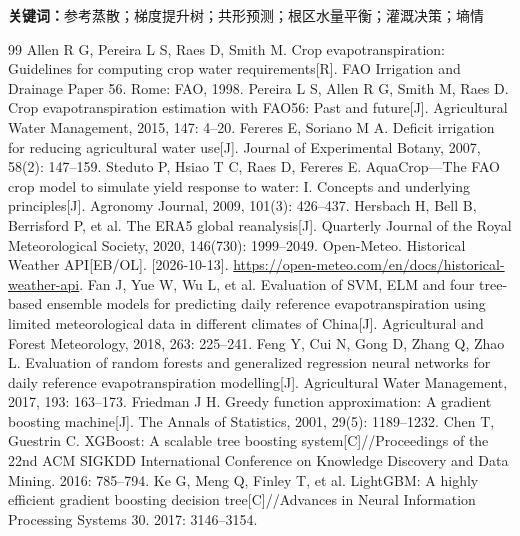 \documentclass[UTF8,a4paper,11pt,fontset=fandol]{ctexart}
\begin{document}
\vspace{5mm}\noindent\textbf{关键词：}参考蒸散；梯度提升树；共形预测；根区水量平衡；灌溉决策；墒情
\clearpage
\setcounter{tocdepth}{2}
\begingroup{}\fontsize{9.5}{10.5}\selectfont\setlength{\parskip}{0pt}\tableofcontents\endgroup
\clearpage{}


\clearpage
\clearpage
\clearpage
\clearpage
\clearpage
\clearpage
{}
\begin{thebibliography}{99}\small
{} Allen R G, Pereira L S, Raes D, Smith M. Crop evapotranspiration: Guidelines for computing crop water requirements[R]. FAO Irrigation and Drainage Paper 56. Rome: FAO, 1998.
 Pereira L S, Allen R G, Smith M, Raes D. Crop evapotranspiration estimation with FAO56: Past and future[J]. Agricultural Water Management, 2015, 147: 4--20.
 Fereres E, Soriano M A. Deficit irrigation for reducing agricultural water use[J]. Journal of Experimental Botany, 2007, 58(2): 147--159.
 Steduto P, Hsiao T C, Raes D, Fereres E. AquaCrop---The FAO crop model to simulate yield response to water: I. Concepts and underlying principles[J]. Agronomy Journal, 2009, 101(3): 426--437.
 Hersbach H, Bell B, Berrisford P, et al. The ERA5 global reanalysis[J]. Quarterly Journal of the Royal Meteorological Society, 2020, 146(730): 1999--2049.
 Open-Meteo. Historical Weather API[EB/OL]. [2026-10-13]. \url{https://open-meteo.com/en/docs/historical-weather-api}.
 Fan J, Yue W, Wu L, et al. Evaluation of SVM, ELM and four tree-based ensemble models for predicting daily reference evapotranspiration using limited meteorological data in different climates of China[J]. Agricultural and Forest Meteorology, 2018, 263: 225--241.
 Feng Y, Cui N, Gong D, Zhang Q, Zhao L. Evaluation of random forests and generalized regression neural networks for daily reference evapotranspiration modelling[J]. Agricultural Water Management, 2017, 193: 163--173.
 Friedman J H. Greedy function approximation: A gradient boosting machine[J]. The Annals of Statistics, 2001, 29(5): 1189--1232.
 Chen T, Guestrin C. XGBoost: A scalable tree boosting system[C]//Proceedings of the 22nd ACM SIGKDD International Conference on Knowledge Discovery and Data Mining. 2016: 785--794.
 Ke G, Meng Q, Finley T, et al. LightGBM: A highly efficient gradient boosting decision tree[C]//Advances in Neural Information Processing Systems 30. 2017: 3146--3154.

\end{thebibliography}
\end{document}
